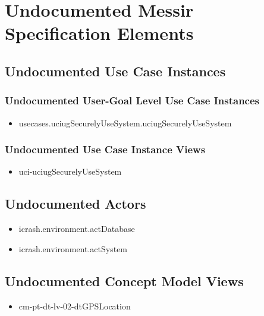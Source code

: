 	
\chapter{Undocumented Messir Specification Elements}





\section[Undocumented Use Case Instances]{Undocumented Use Case Instances}


\subsection[Undocumented Use Case Instances - User-Goal Level]{Undocumented User-Goal Level Use Case Instances}
\begin{itemize}
\item usecases.uciugSecurelyUseSystem.uciugSecurelyUseSystem 
\end{itemize}


\subsection[Undocumented Use Case Instance Views]{Undocumented Use Case Instance Views}
\begin{itemize}
\item uci-uciugSecurelyUseSystem 
\end{itemize}


\section[Undocumented Actors]{Undocumented Actors}
\begin{itemize}
\item icrash.environment.actDatabase 
\item icrash.environment.actSystem 
\end{itemize}














\section[Undocumented Concept Model Views]{Undocumented Concept Model Views}
\begin{itemize}
\item cm-pt-dt-lv-02-dtGPSLocation 
\end{itemize}


